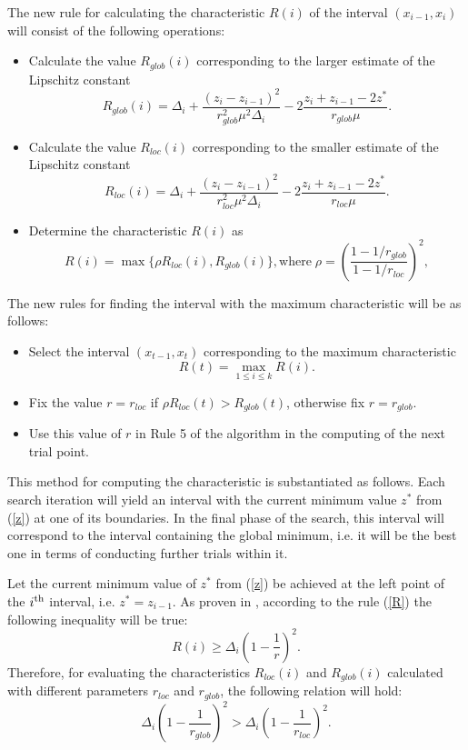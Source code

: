 \documentclass[runningheads]{llncs}
\begin{document}
The new rule for calculating the characteristic $R(i)$ of the interval $(x_{i-1}, x_i)$ will consist of the following operations:
\begin{itemize}
\item
Calculate the value $R_{glob}(i)$ corresponding to the larger estimate of the Lipschitz constant
\[
R_{glob}(i)=\Delta_i+\frac{(z_i-z_{i-1})^2}{r_{glob}^2\mu^2\Delta_i}-2\frac{z_i+z_{i-1}-2z^*}{r_{glob}\mu}.
\]
\item
Calculate the value $R_{loc}(i)$ corresponding to the smaller estimate of the Lipschitz constant
\[
R_{loc}(i)=\Delta_i+\frac{(z_i-z_{i-1})^2}{r_{loc}^2\mu^2\Delta_i}-2\frac{z_i+z_{i-1}-2z^*}{r_{loc}\mu}.
\]
\item
Determine the characteristic $R(i)$ as
\begin{equation}\label{pho}
R(i) = \max\{\rho R_{loc}(i),R_{glob}(i)\}, \textrm{where} \; \rho = \left(\frac{1-1/r_{glob}}{1-1/r_{loc}}\right)^2,
\end{equation}   
\end{itemize}

The new rules for finding the interval with the maximum characteristic will be as follows:
\begin{itemize}
\item 
Select the interval $(x_{t-1},x_t)$ corresponding to the maximum characteristic
\[
R(t)= \max_{1 \leq i \leq k}R(i).
\]
\item
Fix the value $r = r_{loc}$ if $\rho R_{loc}(t) > R_{glob}(t)$, otherwise fix $r=r_{glob}$.
\item
Use this value of $r$ in Rule 5 of the algorithm in the computing of the next trial point.
\end{itemize}


This method for computing the characteristic is substantiated as follows. 
Each search iteration will yield an interval with the current minimum value $z^*$ from (\ref{z}) at one of its boundaries. In the final phase of the search, this interval will correspond to the interval containing the global minimum, i.e. it will be the best one in terms of conducting further trials within it.

Let the current minimum value of $z^*$ from (\ref{z}) be achieved at the left point of the $i^{\rm th}$ interval, i.e. $z^* = z_{i-1}$. 
As proven in \cite{Strongin2000}, according to the rule (\ref{R}) the following inequality will be true: 
\[
R(i) \geq \Delta_i \left( 1 - \frac{1}{r} \right)^2.
\]
Therefore, for evaluating the characteristics $R_{loc}(i)$ and $R_{glob}(i)$ calculated with different parameters $r_{loc}$ and $r_{glob}$, the following relation will hold:
\[
	\Delta_i \left( 1 - \frac{1}{r_{glob}} \right)^2 > \Delta_i \left( 1 - \frac{1}{r_{loc}} \right)^2.
\]
\end{document}

